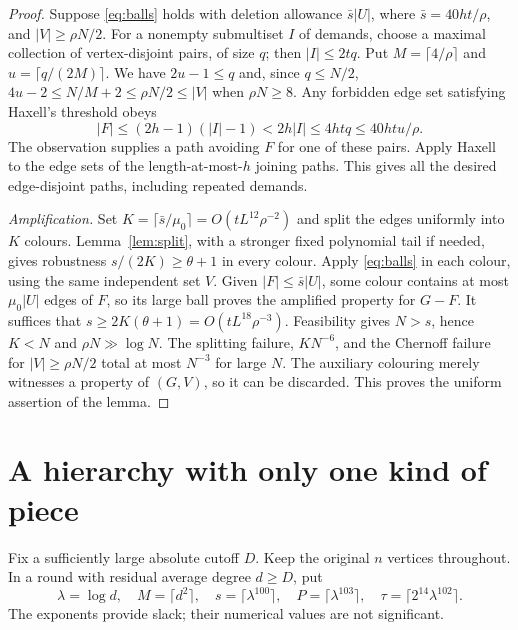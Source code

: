 \documentclass[11pt]{article}
\theoremstyle{remark}\newtheorem*{remark}{Remark}
\begin{document}
\begin{proof}
Suppose \eqref{eq:balls} holds with deletion allowance
$\bar s|U|$, where $\bar s=40ht/\rho$, and $|V|\ge\rho N/2$.
For a nonempty submultiset $I$ of demands, choose a maximal collection
of vertex-disjoint pairs, of size $q$; then $|I|\le2tq$.
Put $M=\lceil4/\rho\rceil$ and $u=\lceil q/(2M)\rceil$.
We have $2u-1\le q$ and, since $q\le N/2$,
$4u-2\le N/M+2\le\rho N/2\le|V|$ when $\rho N\ge8$.
Any forbidden edge set satisfying Haxell's threshold obeys
\[
 |F|\le(2h-1)(|I|-1)<2h|I|\le4htq\le40htu/\rho.
\]
The observation supplies a path avoiding $F$ for one of these pairs.
Apply Haxell to the edge sets of the length-at-most-$h$ joining paths.
This gives all the desired edge-disjoint paths, including repeated demands.

\emph{Amplification.}
Set $K=\lceil\bar s/\mu_0\rceil=O(tL^{12}\rho^{-2})$ and split the
edges uniformly into $K$ colours. Lemma~\ref{lem:split}, with a stronger
fixed polynomial tail if needed, gives robustness $s/(2K)\ge\theta+1$
in every colour. Apply \eqref{eq:balls} in each colour, using the same
independent set $V$. Given $|F|\le\bar s|U|$, some colour contains at
most $\mu_0|U|$ edges of $F$, so its large ball proves the amplified
property for $G-F$. It suffices that
$s\ge2K(\theta+1)=O(tL^{18}\rho^{-3})$.
Feasibility gives $N>s$, hence $K<N$ and $\rho N\gg\log N$.
The splitting failure, $KN^{-6}$, and the Chernoff failure for
$|V|\ge\rho N/2$ total at most $N^{-3}$ for large $N$.
The auxiliary colouring merely witnesses a property of $(G,V)$, so it
can be discarded. This proves the uniform assertion of the lemma.
\end{proof}

\section{A hierarchy with only one kind of piece}
Fix a sufficiently large absolute cutoff $D$. Keep the original $n$
vertices throughout. In a round with residual average degree $d\ge D$, put
\begin{equation}\label{eq:scales}
 \lambda=\log d,\quad M=\lceil d^2\rceil,\quad
 s=\lceil\lambda^{100}\rceil,\quad P=\lceil\lambda^{103}\rceil,
 \quad\tau=\lceil2^{14}\lambda^{102}\rceil.
\end{equation}
The exponents provide slack; their numerical values are not significant.
\end{document}
